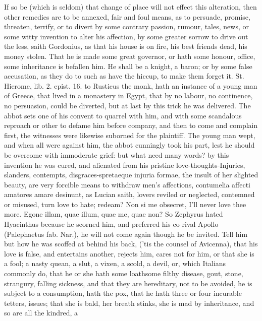If so be (which is seldom) that change of place will not effect this
alteration, then other remedies are to be annexed, fair and foul means,
as to persuade, promise, threaten, terrify, or to divert by some
contrary passion, rumour, tales, news, or some witty invention to alter
his affection, by some greater sorrow to drive out the less,
saith Gordonius, as that his house is on fire, his best friends dead,
his money stolen. That he is made some great governor, or hath
some honour, office, some inheritance is befallen him. He shall be a
knight, a baron; or by some false accusation, as they do to such as
have the hiccup, to make them forget it. St. Hierome, lib. 2. epist.
16. to Rusticus the monk, hath an instance of a young man of Greece,
that lived in a monastery in Egypt, that by no labour, no
continence, no persuasion, could be diverted, but at last by this trick
he was delivered. The abbot sets one of his convent to quarrel with
him, and with some scandalous reproach or other to defame him before
company, and then to come and complain first, the witnesses were
likewise suborned for the plaintiff. The young man wept, and when all
were against him, the abbot cunningly took his part, lest he should be
overcome with immoderate grief: but what need many words? by this
invention he was cured, and alienated from his pristine
love-thoughts-Injuries, slanders, contempts, disgraces-spretaeque
injuria formae, the insult of her slighted beauty, are very forcible
means to withdraw men's affections, contumelia affecti amatores amare
desinunt, as Lucian saith, lovers reviled or neglected, contemned
or misused, turn love to hate; redeam? Non si me obsecret, I'll
never love thee more. Egone illam, quae illum, quae me, quae non? So
Zephyrus hated Hyacinthus because he scorned him, and preferred his
co-rival Apollo (Palephaetus fab. Nar.), he will not come again though
he be invited. Tell him but how he was scoffed at behind his back,
('tis the counsel of Avicenna), that his love is false, and entertains
another, rejects him, cares not for him, or that she is a fool; a nasty
quean, a slut, a vixen, a scold, a devil, or, which Italians commonly
do, that he or she hath some loathsome filthy disease, gout, stone,
strangury, falling sickness, and that they are hereditary, not to be
avoided, he is subject to a consumption, hath the pox, that he hath
three or four incurable tetters, issues; that she is bald, her breath
stinks, she is mad by inheritance, and so are all the kindred, a
